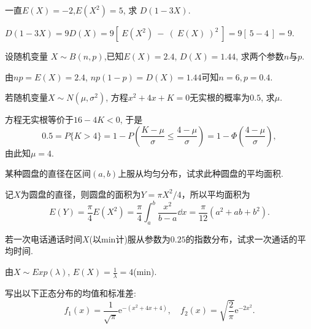 \documentclass[11pt]{ctexart}
\begin{document}
\begin{example}
	一直$E(X)=-2$,$E(X^{2})=5$, 求 $D(1-3X)$.
\end{example}
\begin{solution}
	$D(1-3X)=9D(X)=9[\:E(X^{2})\:-\:(\:E(X)\:)^{2}\:]=9[\:5-4\:]=9$.
\end{solution}

\begin{example}
	设随机变量 $X\sim B(n,p)$,已知$E(X)=2.4$, $D(X)=1.44$, 求两个参数$n$与$p$. 
\end{example}
\begin{solution}
	由$np = E(X) = 2.4$, $np(1-p) = D(X) = 1.44$可知$n=6, p = 0.4$. 
\end{solution}

\begin{example}
	若随机变量$X \sim N(\mu, \sigma^2)$, 方程$x^2 + 4x + K = 0$无实根的概率为$0.5$, 求$\mu$. 
\end{example}
\begin{solution}
	方程无实根等价于$16 - 4K < 0$, 于是
	\begin{equation*}
		0.5 
		= P\{K > 4\} 
		= 1 - P\left(\frac{K - \mu}{\sigma} \leq \frac{4 - \mu}{\sigma} \right)
		= 1 - \Phi\left(\frac{4 - \mu}{\sigma} \right), 
	\end{equation*}
	由此知$\mu = 4$. 
\end{solution}
\begin{example}
	某种圆盘的直径在区间$(a,b)$上服从均匀分布，试求此种圆盘的平均面积. 
\end{example}
\begin{solution}
	记$X$为圆盘的直径，则圆盘的面积为$Y=\pi X^2/4$，所以平均面积为
	\begin{equation*}
		E(Y) 
		= \frac{\pi}{4} E(X^2) 
		= \frac{\pi}{4} \int_a^b \frac{x^2}{b-a} \dd x
		= \frac{\pi}{12} (a^2 + ab + b^2). 
	\end{equation*}
\end{solution}
\begin{example}
	若一次电话通话时间$X$(以min计)服从参数为$0.25$的指数分布，试求一次通话的平均时间. 
\end{example}
\begin{solution}
	由$X \sim Exp(\lambda)$, $E(X) = \frac{1}{\lambda} = 4$(min). 
\end{solution}
\begin{example}
	写出以下正态分布的均值和标准差:
	\begin{equation*}
		f_{1}\left(x\right)=\frac{1}{\sqrt{\pi}}\mathrm{e}^{-\left(x^2+4x+4\right)}, \quad
		f_{2}\left(x\right)=\sqrt{\frac{2}{\pi}}\mathrm{e}^{-2x^{2}}. 
	\end{equation*}
\end{example}
\end{document}

